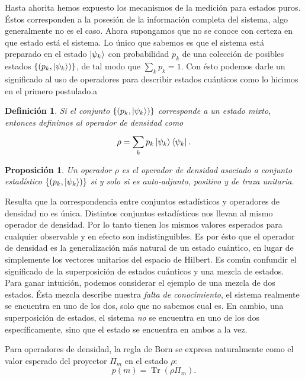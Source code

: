 \documentclass[a4paper]{report}
\DeclareMathOperator{\Tr}{Tr}
\newtheorem{definition}{Definición}
\newtheorem{proposition}{Proposición}
\begin{document}
  Hasta ahorita hemos expuesto los mecanismos de la medición
  para estados puros. Éstos corresponden a la posesión de la
  información completa del sistema, algo generalmente no es
  el caso. Ahora supongamos que no se conoce con certeza en
  que estado está el sistema. Lo único que sabemos es que el
  sistema está preparado en el estado $\ket{\psi_k}$ con
  probabilidad $p_k$ de una colección de posibles estados
  $\{(p_k, \ket{\psi_k})\}$, de tal modo que $\sum_{k}^{}
  p_k = 1$. Con ésto podemos darle un significado al uso de
  operadores para describir estados cuánticos como lo
  hicimos en el primero postulado.a
  \begin{definition}
    \label{def:density_operator}
    Si el conjunto $\{(p_k, \ket{\psi_k})\}$ corresponde a
    un estado mixto, entonces definimos al operador de
    densidad como 
    \begin{equation}
      \rho 
      = \sum_{k}^{} p_k \ket{\psi_k}\bra{\psi_k}.
    \end{equation}
  \end{definition}
  \begin{proposition}
    Un operador $\rho$ es el operador de densidad asociado a
    conjunto estadístico $\{(p_k, \ket{\psi_k})\}$ si y solo
    si es auto-adjunto, positivo y de traza unitaria.
  \end{proposition}
  Resulta que la correspondencia entre conjuntos
  estadísticos y operadores de densidad no es única.
  Distintos conjuntos estadísticos nos llevan al mismo
  operador de densidad. Por lo tanto tienen los mismos
  valores esperados para cualquier observable y en efecto
  son indistinguibles. Es por ésto que el operador de
  densidad es la generalización más natural de un estado
  cuántico, en lugar de simplemente los vectores unitarios
  del espacio de Hilbert. Es común confundir el significado
  de la superposición de estados cuánticos y una mezcla de
  estados. Para ganar intuición, podemos considerar el
  ejemplo de una mezcla de dos estados. Ésta mezcla describe
  nuestra \textit{falta de conocimiento}, el sistema
  realmente se encuentra en uno de los dos, solo que no
  sabemos cual es. En cambio, una superposición de estados,
  el sistema \textit{no} se encuentra en uno de los dos
  específicamente, sino que el estado se encuentra en ambos
  a la vez.

  Para operadores de densidad, la regla de Born se expresa
  naturalmente como el valor esperado del proyector $\Pi_m$ 
  en el estado $\rho$:
  \begin{equation}
    p(m) = \Tr\left( \rho \Pi_m \right). 
  \end{equation}
\end{document}
